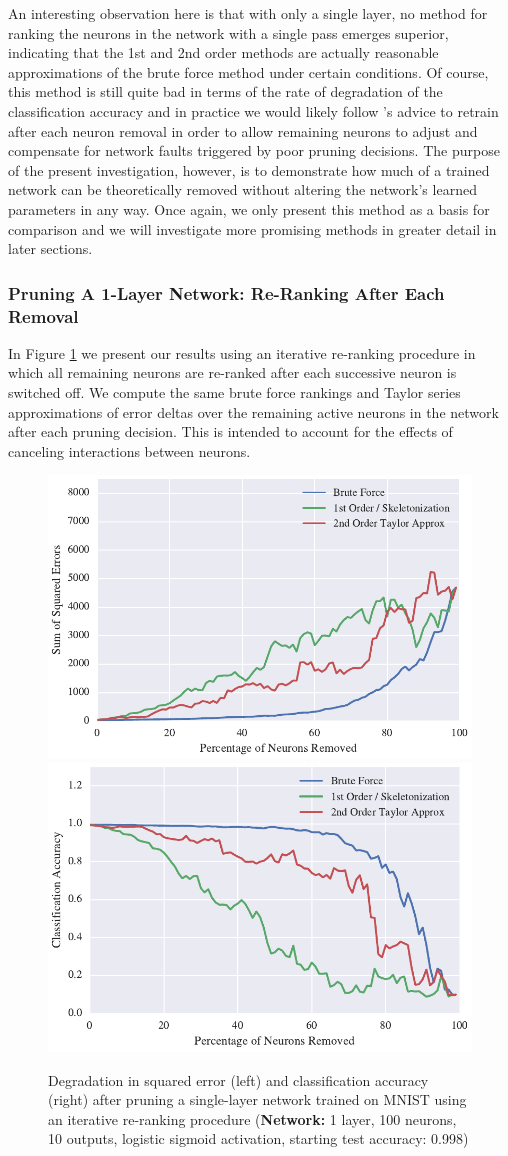 An interesting observation here is that with only a single layer, no method for ranking the neurons in the network with a single pass emerges superior, indicating that the 1st and 2nd order methods are actually reasonable approximations of the brute force method under certain conditions. Of course, this method is still quite bad in terms of the rate of degradation of the classification accuracy and in practice we would likely follow \cite{mozer1989skeletonization}'s advice to retrain after each neuron removal in order to allow remaining neurons to adjust and compensate for network faults triggered by poor pruning decisions. The purpose of the present investigation, however, is to demonstrate how much of a trained network can be theoretically removed without altering the network's learned parameters in any way. Once again, we only present this method as a basis for comparison and we will investigate more promising methods in greater detail in later sections. 

\subsubsection{Pruning A 1-Layer Network: Re-Ranking After Each Removal}
In Figure \ref{fig:mnist-re-ranking-single-layer} we present our results using an iterative re-ranking procedure in which all remaining neurons are re-ranked after each successive neuron is switched off. We compute the same brute force rankings and Taylor series approximations of error deltas over the remaining active neurons in the network after each pruning decision. This is intended to account for the effects of canceling interactions between neurons. 

\begin{figure}[!hb]
\centering
\includegraphics[width=0.49\linewidth]{png/mnist-acc99-iterative-rerank-method.pdf}
\includegraphics[width=0.49\linewidth]{png/mnist-acc99-iterative-rerank-accuracy.pdf}
\caption{Degradation in squared error (left) and classification accuracy (right) after pruning a single-layer network trained on MNIST using an iterative re-ranking procedure (\textbf{Network:} 1 layer, 100 neurons, 10 outputs, logistic sigmoid activation, starting test accuracy: 0.998)}
\label{fig:mnist-re-ranking-single-layer}
\end{figure}


